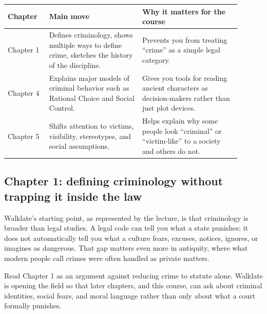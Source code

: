 \documentclass[11pt]{article}
\begin{document}
\begin{tabular}{@{}p{0.16\linewidth}p{0.36\linewidth}p{0.38\linewidth}@{}}
\toprule
\textbf{Chapter} & \textbf{Main move} & \textbf{Why it matters for the course} \\
\midrule
Chapter 1 & Defines criminology, shows multiple ways to define crime, sketches the history of the discipline. & Prevents you from treating ``crime'' as a simple legal category. \\
Chapter 4 & Explains major models of criminal behavior such as Rational Choice and Social Control. & Gives you tools for reading ancient characters as decision-makers rather than just plot devices. \\
Chapter 5 & Shifts attention to victims, visibility, stereotypes, and social assumptions. & Helps explain why some people look ``criminal'' or ``victim-like'' to a society and others do not. \\
\bottomrule
\end{tabular}

\subsection*{Chapter 1: defining criminology without trapping it inside the law}
Walklate's starting point, as represented by the lecture, is that criminology is broader than legal studies. A legal code can tell you what a state punishes; it does not automatically tell you what a culture fears, excuses, notices, ignores, or imagines as dangerous. That gap matters even more in antiquity, where what modern people call crimes were often handled as private matters.

Read Chapter 1 as an argument against reducing crime to statute alone. Walklate is opening the field so that later chapters, and this course, can ask about criminal identities, social fears, and moral language rather than only about what a court formally punishes.
\end{document}
